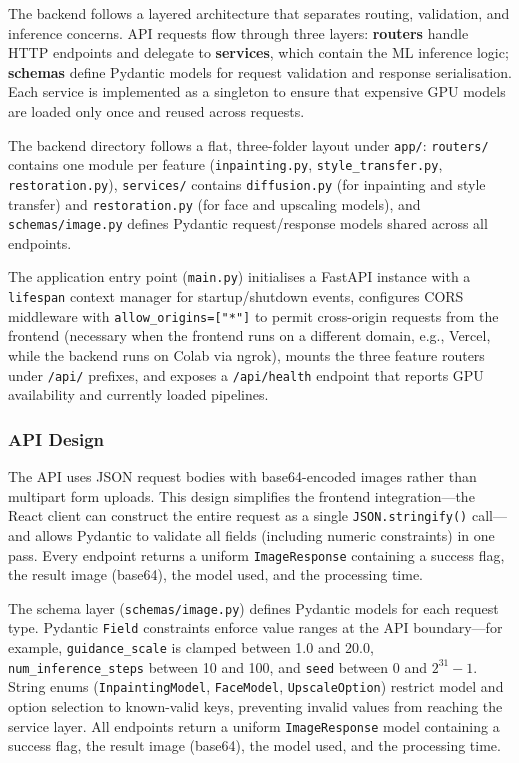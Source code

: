 \documentclass[12pt,a4paper]{report}
\begin{document}
The backend follows a layered architecture that separates routing, validation, and inference concerns. API requests flow through three layers: \textbf{routers} handle HTTP endpoints and delegate to \textbf{services}, which contain the ML inference logic; \textbf{schemas} define Pydantic models for request validation and response serialisation. Each service is implemented as a singleton to ensure that expensive GPU models are loaded only once and reused across requests.

The backend directory follows a flat, three-folder layout under \texttt{app/}: \texttt{routers/} contains one module per feature (\texttt{inpainting.py}, \texttt{style\_transfer.py}, \texttt{restoration.py}), \texttt{services/} contains \texttt{diffusion.py} (for inpainting and style transfer) and \texttt{restoration.py} (for face and upscaling models), and \texttt{schemas/image.py} defines Pydantic request/response models shared across all endpoints.

The application entry point (\texttt{main.py}) initialises a FastAPI instance with a \texttt{lifespan} context manager for startup/shutdown events, configures CORS middleware with \texttt{allow\_origins=["*"]} to permit cross-origin requests from the frontend (necessary when the frontend runs on a different domain, e.g., Vercel, while the backend runs on Colab via ngrok), mounts the three feature routers under \texttt{/api/} prefixes, and exposes a \texttt{/api/health} endpoint that reports GPU availability and currently loaded pipelines.

\subsubsection{API Design}
\label{sec:api_design}

The API uses JSON request bodies with base64-encoded images rather than multipart form uploads. This design simplifies the frontend integration---the React client can construct the entire request as a single \texttt{JSON.stringify()} call---and allows Pydantic to validate all fields (including numeric constraints) in one pass. Every endpoint returns a uniform \texttt{ImageResponse} containing a success flag, the result image (base64), the model used, and the processing time.

The schema layer (\texttt{schemas/image.py}) defines Pydantic models for each request type. Pydantic \texttt{Field} constraints enforce value ranges at the API boundary---for example, \texttt{guidance\_scale} is clamped between 1.0 and 20.0, \texttt{num\_inference\_steps} between 10 and 100, and \texttt{seed} between 0 and $2^{31}-1$. String enums (\texttt{InpaintingModel}, \texttt{FaceModel}, \texttt{UpscaleOption}) restrict model and option selection to known-valid keys, preventing invalid values from reaching the service layer. All endpoints return a uniform \texttt{ImageResponse} model containing a success flag, the result image (base64), the model used, and the processing time.
\end{document}
